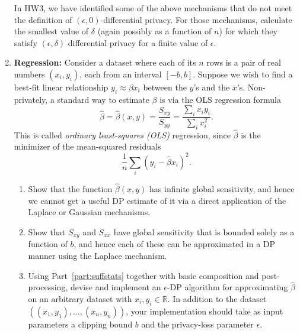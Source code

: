 \documentclass[11pt]{article}
\newcommand{\R}{\mathbb{R}}
\begin{document}
\begin{enumerate}[leftmargin=*]
\begin{enumerate}[label=\roman*.]
\end{enumerate}

In HW3, we have identified some of the above mechanisms that do not meet the definition of $(\epsilon,0)$-differential privacy. For those mechanisms,
    calculate the smallest value of $\delta$ (again possibly as a function of $n$) for which they satisfy $(\epsilon,\delta)$ differential privacy for a finite value of $\epsilon$.

\item \textbf{Regression: } 
Consider a dataset where each of its $n$ rows is a pair of real numbers $(x_i,y_i)$, each from an interval $[-b,b]$.  Suppose we wish to find a best-fit linear relationship $y_i \approx \beta x_i$ between the $y$'s and the $x$'s.  Non-privately, a standard way to estimate $\beta$ is via the OLS regression formula 
$$\hat{\beta} = \hat{\beta}(x,y) =  \frac{S_{xy}}{S_{yy}}
= \frac{\sum_i x_iy_i}{\sum_i x_i^2}.$$
This is called {\em ordinary least-squares (OLS)} regression, since $\hat{\beta}$ is the minimizer of the mean-squared residuals 
\begin{equation} \label{eqn:residuals}
    \frac{1}{n} \sum_i (y_i -\hat{\beta} x_i)^2.
\end{equation}

\begin{enumerate}
    \item Show that the function $\hat{\beta}(x,y)$ has infinite global sensitivity, and hence we cannot get a useful DP estimate of it via a direct application of the Laplace or Gaussian mechanisms.
    \item Show that $S_{xy}$ and $S_{xx}$ have global sensitivity that is bounded solely as a function of $b$, and hence each of these can be approximated in a DP manner using the Laplace mechanism. \label{part:suffstats}
    \item Using Part~\ref{part:suffstats} together with basic composition and post-processing,  devise and implement an $\epsilon$-DP algorithm for approximating $\hat{\beta}$ on an arbitrary dataset with $x_i,y_i\in \R$.  In addition to the dataset $((x_1,y_1),\ldots,(x_n,y_n))$, your implementation should take as input parameters a clipping bound $b$ and the privacy-loss parameter $\epsilon$.


\end{enumerate}
\end{enumerate}
\end{document}
